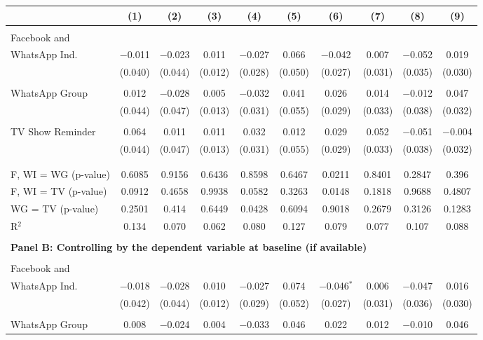 \documentclass[12pt]{article}
\begin{document}
\begin{table}
\begin{tabular}{@{\extracolsep{0pt}}lccccccccc}
\\[-1.8ex] & (1) & (2) & (3) & (4) & (5) & (6) & (7) & (8) & (9)\\ 
\hline \\[-1.8ex] 
 Facebook and \\ WhatsApp Ind. & $-$0.011 & $-$0.023 & 0.011 & $-$0.027 & 0.066 & $-$0.042 & 0.007 & $-$0.052 & 0.019 \\ 
  & (0.040) & (0.044) & (0.012) & (0.028) & (0.050) & (0.027) & (0.031) & (0.035) & (0.030) \\ 
  & & & & & & & & & \\ 
 WhatsApp Group & 0.012 & $-$0.028 & 0.005 & $-$0.032 & 0.041 & 0.026 & 0.014 & $-$0.012 & 0.047 \\ 
  & (0.044) & (0.047) & (0.013) & (0.031) & (0.055) & (0.029) & (0.033) & (0.038) & (0.032) \\ 
  & & & & & & & & & \\ 
 TV Show Reminder & 0.064 & 0.011 & 0.011 & 0.032 & 0.012 & 0.029 & 0.052 & $-$0.051 & $-$0.004 \\ 
  & (0.044) & (0.047) & (0.013) & (0.031) & (0.055) & (0.029) & (0.033) & (0.038) & (0.032) \\ 
  & & & & & & & & & \\ 
\hline \\[-1.8ex] 
F, WI = WG (p-value) & 0.6085 & 0.9156 & 0.6436 & 0.8598 & 0.6467 & 0.0211 & 0.8401 & 0.2847 & 0.396 \\ 
F, WI = TV (p-value) & 0.0912 & 0.4658 & 0.9938 & 0.0582 & 0.3263 & 0.0148 & 0.1818 & 0.9688 & 0.4807 \\ 
WG = TV (p-value) & 0.2501 & 0.414 & 0.6449 & 0.0428 & 0.6094 & 0.9018 & 0.2679 & 0.3126 & 0.1283 \\ 
R$^{2}$ & 0.134 & 0.070 & 0.062 & 0.080 & 0.127 & 0.079 & 0.077 & 0.107 & 0.088 \\ 
\hline 
\\[-0.5ex] 
\multicolumn{10}{l}{\textbf{Panel B: Controlling by the dependent variable at baseline (if available)}} \\
\hline \\[-1ex]  
 Facebook and \\ WhatsApp Ind. & $-$0.018 & $-$0.028 & 0.010 & $-$0.027 & 0.074 & $-$0.046$^{*}$ & 0.006 & $-$0.047 & 0.016 \\ 
  & (0.042) & (0.044) & (0.012) & (0.029) & (0.052) & (0.027) & (0.031) & (0.036) & (0.030) \\ 
  & & & & & & & & & \\ 
 WhatsApp Group & 0.008 & $-$0.024 & 0.004 & $-$0.033 & 0.046 & 0.022 & 0.012 & $-$0.010 & 0.046 \\ 

\end{tabular}
\end{table}
\end{document}
